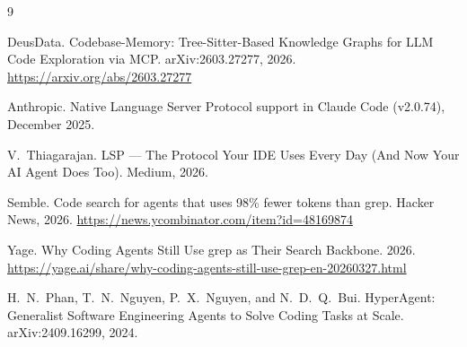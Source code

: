 \documentclass[11pt]{article}
\begin{document}
\begin{thebibliography}{9}

DeusData.
\newblock Codebase-Memory: Tree-Sitter-Based Knowledge Graphs for LLM Code
Exploration via MCP.
\newblock arXiv:2603.27277, 2026. \url{https://arxiv.org/abs/2603.27277}

Anthropic.
\newblock Native Language Server Protocol support in Claude Code (v2.0.74),
December 2025.

V.\ Thiagarajan.
\newblock LSP --- The Protocol Your IDE Uses Every Day (And Now Your AI Agent
Does Too). Medium, 2026.

Semble.
\newblock Code search for agents that uses 98\% fewer tokens than grep.
Hacker News, 2026. \url{https://news.ycombinator.com/item?id=48169874}

Yage.
\newblock Why Coding Agents Still Use grep as Their Search Backbone. 2026.
\url{https://yage.ai/share/why-coding-agents-still-use-grep-en-20260327.html}

H.\ N.\ Phan, T.\ N.\ Nguyen, P.\ X.\ Nguyen, and N.\ D.\ Q.\ Bui.
\newblock HyperAgent: Generalist Software Engineering Agents to Solve Coding Tasks
at Scale.
\newblock arXiv:2409.16299, 2024.

\end{thebibliography}
\end{document}
